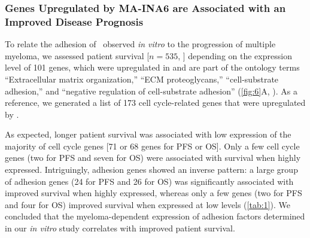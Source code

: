 \subsubsection*{Genes Upregulated by MA-INA6 are Associated with an Improved
    Disease Prognosis}%
\label{C1:results:RNAseq:patient_survival}%
To relate the adhesion of \MAina\ observed \textit{in vitro} to the progression
of multiple myeloma, we assessed patient survival [$n = 535$,
        \citet{seckingerTargetExpressionGeneration2017b,
            seckingerCD38ImmunotherapeuticTarget2018}] depending on the expression level of
101 genes, which were upregulated in  and are part of the
ontology terms ``Extracellular matrix organization,'' ``ECM proteoglycans,''
``cell-substrate adhesion,'' and ``negative regulation of cell-substrate
adhesion'' (\autoref{fig:6}A, ). As a
reference, we generated a list of 173 cell cycle-related genes that were
upregulated by .

As expected, longer patient survival was associated with low expression of the
majority of cell cycle genes [71 or 68 genes for \ac{PFS}
        or \ac{OS}]. Only a few cell cycle genes (two for PFS and seven
for OS) were associated with survival when highly expressed. Intriguingly,
adhesion genes showed an inverse pattern: a large group of adhesion genes (24
for PFS and 26 for OS) was significantly associated with improved survival when
highly expressed, whereas only a few genes (two for PFS and four for OS)
improved survival when expressed at low levels (\autoref{tab:1}). We concluded
that the myeloma-dependent expression of adhesion factors determined in our
\textit{in vitro} study correlates with improved patient survival.



